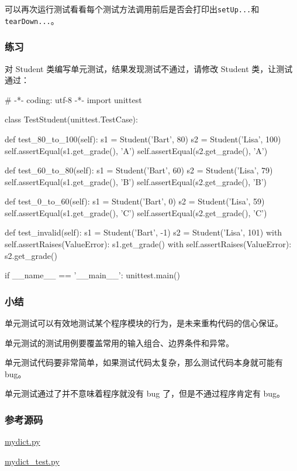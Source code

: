 可以再次运行测试看看每个测试方法调用前后是否会打印出\texttt{setUp...}和\texttt{tearDown...}。

\hypertarget{ux7ec3ux4e60}{%
\subsubsection{练习}\label{ux7ec3ux4e60}}

对 Student 类编写单元测试，结果发现测试不通过，请修改 Student
类，让测试通过：

\begin{pythoncode}
# -*- coding: utf-8 -*-
import unittest
\end{pythoncode}

\begin{pythoncode}
class TestStudent(unittest.TestCase):

    def test_80_to_100(self):
        s1 = Student('Bart', 80)
        s2 = Student('Lisa', 100)
        self.assertEqual(s1.get_grade(), 'A')
        self.assertEqual(s2.get_grade(), 'A')

    def test_60_to_80(self):
        s1 = Student('Bart', 60)
        s2 = Student('Lisa', 79)
        self.assertEqual(s1.get_grade(), 'B')
        self.assertEqual(s2.get_grade(), 'B')

    def test_0_to_60(self):
        s1 = Student('Bart', 0)
        s2 = Student('Lisa', 59)
        self.assertEqual(s1.get_grade(), 'C')
        self.assertEqual(s2.get_grade(), 'C')

    def test_invalid(self):
        s1 = Student('Bart', -1)
        s2 = Student('Lisa', 101)
        with self.assertRaises(ValueError):
            s1.get_grade()
        with self.assertRaises(ValueError):
            s2.get_grade()

if __name__ == '__main__':
    unittest.main()
\end{pythoncode}

\hypertarget{ux5c0fux7ed3}{%
\subsubsection{小结}\label{ux5c0fux7ed3}}

单元测试可以有效地测试某个程序模块的行为，是未来重构代码的信心保证。

单元测试的测试用例要覆盖常用的输入组合、边界条件和异常。

单元测试代码要非常简单，如果测试代码太复杂，那么测试代码本身就可能有
bug。

单元测试通过了并不意味着程序就没有 bug 了，但是不通过程序肯定有 bug。

\hypertarget{ux53c2ux8003ux6e90ux7801}{%
\subsubsection{参考源码}\label{ux53c2ux8003ux6e90ux7801}}

\href{https://github.com/michaelliao/learn-python3/blob/master/samples/debug/mydict.py}{mydict.py}

\href{https://github.com/michaelliao/learn-python3/blob/master/samples/debug/mydict_test.py}{mydict\_test.py}

